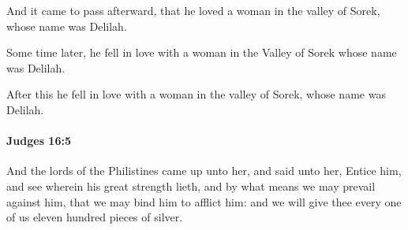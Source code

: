 			\begin{versebox}
					\item[BHS] 
					\item[ASV] And it came to pass afterward, that he loved a woman in the valley of Sorek, whose name was Delilah.
					\item[NIV] Some time later, he fell in love with a woman in the Valley of Sorek whose name was Delilah.
					\item[NRSV] After this he fell in love with a woman in the valley of Sorek, whose name was Delilah.
			\end{versebox}

		\paragraph{Judges 16:5} %
			\label{JUDGES-16-5}

			And the lords of the Philistines came up unto her, and said unto her, Entice him, and see wherein his great strength lieth, and by what means we may prevail against him, that we may bind him to afflict him: and we will give thee every one of us eleven hundred pieces of silver.

